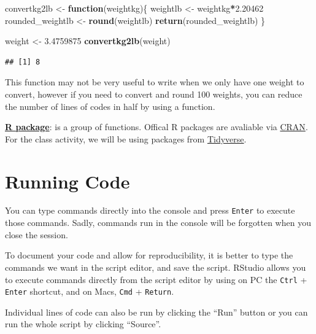 \documentclass[
]{book}
\newenvironment{Shaded}{\begin{snugshade}}{\end{snugshade}}
\newcommand{\ControlFlowTok}[1]{\textcolor[rgb]{0.13,0.29,0.53}{\textbf{#1}}}
\newcommand{\FloatTok}[1]{\textcolor[rgb]{0.00,0.00,0.81}{#1}}
\newcommand{\KeywordTok}[1]{\textcolor[rgb]{0.13,0.29,0.53}{\textbf{#1}}}
\newcommand{\NormalTok}[1]{#1}
\newcommand{\OperatorTok}[1]{\textcolor[rgb]{0.81,0.36,0.00}{\textbf{#1}}}
\newcommand{\StringTok}[1]{\textcolor[rgb]{0.31,0.60,0.02}{#1}}
\begin{document}
\begin{Shaded}
\begin{Highlighting}[]
\NormalTok{convertkg2lb \textless{}{-}}\StringTok{ }\ControlFlowTok{function}\NormalTok{(weightkg)\{}
\NormalTok{  weightlb \textless{}{-}}\StringTok{ }\NormalTok{weightkg}\OperatorTok{*}\FloatTok{2.20462}
\NormalTok{  rounded\_weightlb \textless{}{-}}\StringTok{ }\KeywordTok{round}\NormalTok{(weightlb)}
  \KeywordTok{return}\NormalTok{(rounded\_weightlb)}
\NormalTok{\}}

\NormalTok{weight \textless{}{-}}\StringTok{ }\FloatTok{3.4759875}
\KeywordTok{convertkg2lb}\NormalTok{(weight)}
\end{Highlighting}
\end{Shaded}

\begin{verbatim}
## [1] 8
\end{verbatim}

This function may not be very useful to write when we only have one weight to convert, however if you need to convert and round 100 weights, you can reduce the number of lines of codes in half by using a function.

\href{https://www.datacamp.com/community/tutorials/r-packages-guide}{\textbf{R package}}: is a group of functions. Offical R packages are avaliable via \href{https://cran.r-project.org/}{CRAN}. For the class activity, we will be using packages from \href{https://www.tidyverse.org/}{Tidyverse}.

\hypertarget{running-code}{%
\section{Running Code}\label{running-code}}

You can type commands directly into the console and press \texttt{Enter} to execute those commands. Sadly, commands run in the console will be forgotten when you close the session.

To document your code and allow for reproducibility, it is better to type the commands we want in the script editor, and save the script. RStudio allows you to execute commands directly from the script editor by using on PC the \texttt{Ctrl} + \texttt{Enter} shortcut, and on Macs, \texttt{Cmd} + \texttt{Return}.

Individual lines of code can also be run by clicking the ``Run'' button or you can run the whole script by clicking ``Source''.
\end{document}
